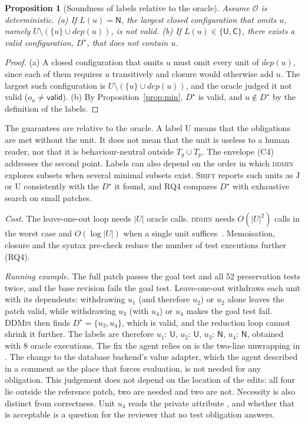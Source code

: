 \documentclass[a4paper,fleqn]{cas-sc}
\newcommand{\tool}{\textsc{Shift}}
\newcommand{\code}[1]{\texttt{\detokenize{#1}}}
\newcommand{\lab}[1]{\textsf{#1}}
\newtheorem{proposition}{Proposition}
\newcommand{\exOracleCalls}{8}
\begin{document}
\begin{proposition}[Soundness of labels relative to the oracle]\label{prop:sound}
Assume $\mathcal{O}$ is deterministic. (a) If $L(u)=\lab{N}$, the largest closed configuration that omits $u$, namely $U\setminus(\{u\}\cup\mathit{dep}(u))$, is not valid. (b) If $L(u)\in\{\lab{U},\lab{C}\}$, there exists a valid configuration, $D^\star$, that does not contain $u$.
\end{proposition}
\begin{proof}
(a) A closed configuration that omits $u$ must omit every unit of $\mathit{dep}(u)$, since each of them requires $u$ transitively and closure would otherwise add $u$. The largest such configuration is $U\setminus(\{u\}\cup\mathit{dep}(u))$, and the oracle judged it not valid ($o_u\neq\lab{valid}$). (b) By Proposition~\ref{prop:min}, $D^\star$ is valid, and $u\notin D^\star$ by the definition of the labels.
\end{proof}


The guarantees are relative to the oracle. A label \lab{U} means that the obligations are met without the unit. It does not mean that the unit is useless to a human reader, nor that it is behaviour-neutral outside $T_g\cup T_p$. The envelope (C4) addresses the second point. Labels can also depend on the order in which \textsc{ddmin} explores subsets when several minimal subsets exist. \tool{} reports such units as \lab{J} or \lab{U} consistently with the $D^\star$ it found, and RQ4 compares $D^\star$ with exhaustive search on small patches.

\emph{Cost.} The leave-one-out loop needs $|U|$ oracle calls. \textsc{ddmin} needs $O(|U|^2)$ calls in the worst case and $O(\log |U|)$ when a single unit suffices~\citep{zeller2002ddmin}. Memoisation, closure and the syntax pre-check reduce the number of test executions further (RQ4).

\emph{Running example.} The full patch passes the goal test and all 52 preservation tests twice, and the base revision fails the goal test. Leave-one-out withdraws each unit with its dependents: withdrawing $u_1$ (and therefore $u_2$) or $u_2$ alone leaves the patch valid, while withdrawing $u_3$ (with $u_4$) or $u_4$ makes the goal test fail. \textsc{DDMin} then finds $D^\star=\{u_3,u_4\}$, which is valid, and the reduction loop cannot shrink it further. The labels are therefore $u_1{:}\,\lab{U}$, $u_2{:}\,\lab{U}$, $u_3{:}\,\lab{N}$, $u_4{:}\,\lab{N}$, obtained with \exOracleCalls{} oracle executions. The fix the agent relies on is the two-line unwrapping in \code{Field.get_prep_value}. The change to the database backend's value adapter, which the agent described in a comment as the place that forces evaluation, is not needed for any obligation. This judgement does not depend on the location of the edits: all four lie outside the reference patch, two are needed and two are not. Necessity is also distinct from correctness. Unit $u_4$ reads the private attribute \code{_wrapped}, and whether that is acceptable is a question for the reviewer that no test obligation answers.
\end{document}

